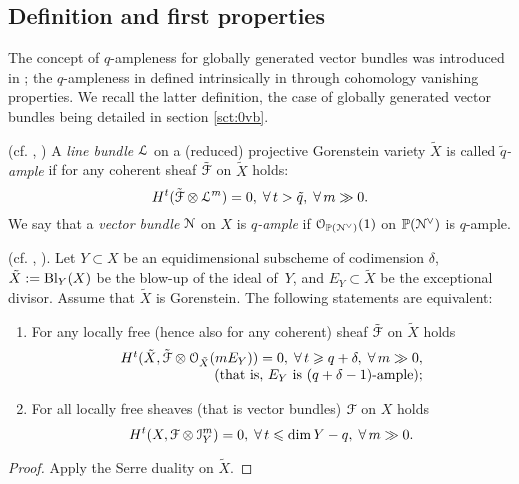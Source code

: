 \documentclass[11pt,reqno]{amsart}
\let\euf\EuScript
\let\mbb\mathbb
\let\tld\tilde
\numberwithin{equation}{section}
\numberwithin{figure}{section}
\let\ges\geqslant
\let\les\leqslant
\begin{document}
\subsection{Definition and first properties}\label{ssct:q-ample} 

The concept of $q$-ampleness for globally generated vector bundles was introduced in 
\cite{so}; the $q$-ampleness in defined intrinsically in \cite{ar,to} through cohomology 
vanishing properties. We recall the latter definition, the case of globally generated 
vector bundles being detailed in section \ref{sct:0vb}. 

\begin{m-definition}\label{def:q-line}
(cf. \cite[Theorem 7.1]{to}, \cite[Lemma 2.1]{ar}) 
A \emph{line bundle} ${{\euf L}}$ on a (reduced) projective Gorenstein variety $\tld X$ is 
called \emph{$\tld q$-ample} if for any coherent sheaf $\tld{{\euf F}}$ on $\tld X$ holds: 
$$
H^t(\tld{{\euf F}}\otimes{{\euf L}}^{m})=0,\;\forall\,t>\tld q ,\;\forall\,m\gg0.
$$
We say that a \emph{vector bundle} ${{\euf N}}$ on $X$ is \emph{$q$-ample} if 
${{\euf O}}_{\mbb P({{\euf N}}^\vee)}(1)$ on $\mbb P({{\euf N}}^\vee)$ is $q$-ample. 
\end{m-definition}

\begin{m-proposition}\label{prop:q1}
{\rm (cf. \cite[Section 7]{to},  \cite[Definition 3.1]{ot}).} 
Let $Y\subset X$ be an equidimensional subscheme of codimension $\delta$, 
$\tld X:={{\rm Bl}}_Y(X)$ be the blow-up of the ideal of $\,Y$, and $E_Y\subset\tld X$ 
be the exceptional divisor. Assume that $\tld X$ is Gorenstein. 
The following statements are equivalent: 
\begin{enumerate}
\item For any locally free (hence also for any coherent) sheaf $\tld{{\euf F}}$ on $\tld X$ holds 
\begin{equation}\label{eq:q11}
\begin{array}{r}
H^{t}(\tld X,\tld{{\euf F}}\otimes{{\euf O}}_{\tld X}(mE_Y))=0,\;\forall\,t\ges q+\delta,
\;\forall\,m\gg0,
\\ 
(\text{that is, $E_Y$ is $(q+\delta-1)$-ample});
\end{array}
\end{equation}
\item For all locally free sheaves (that is vector bundles) ${{\euf F}}$ on $X$ holds 
\begin{equation}\label{eq:q12}
H^t(X,{{\euf F}}\otimes{{\euf I}}_Y^m)=0,\;\forall\,t\les \dim Y- q,\;\forall\,m\gg0.
\end{equation}
\end{enumerate}
\end{m-proposition}
\begin{proof}
Apply the Serre duality on $\tld X$. 
\end{proof}
\end{document}

